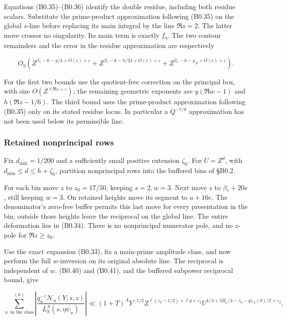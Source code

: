 \documentclass[11pt,a4paper]{article}
\begin{document}
Equations (B0.35)--(B0.36) identify the double residue, including both
residue scalars. Substitute the prime-product approximation following
(B0.35) on the global \(s\)-line before replacing its main integral by
the line \(\Re s=2\). The latter move crosses no singularity. Its main
term is exactly \(f_\eta\). The two contour remainders and the error in
the residue approximation are respectively

\[
O_\eta\!\left(
 Z^{\beta_*-k-y/4+O(e)+\varepsilon}
+Z^{\beta_*-k-h/24+O(e)+\varepsilon}
+Z^{\beta_*-k-\mu_P+O(e)+\varepsilon}
\right).
\tag{B0.52}
\]

For the first two bounds use the quotient-free correction on the
principal box, with size \(O(Z^{\ell\Re z+\varepsilon})\); the remaining
geometric exponents are \(y(\Re w-1)\) and \(h(\Re z-1/6)\). The third
bound uses the prime-product approximation following (B0.35) only on its
stated residue locus. In particular a \(Q^{-7/8}\) approximation has not
been used below its permissible line.

\hypertarget{retained-nonprincipal-rows}{%
\subsubsection{Retained nonprincipal
rows}\label{retained-nonprincipal-rows}}

Fix \(d_{\min}=1/200\) and a sufficiently small positive extension
\(\zeta_0\). For \(U=Z^d\), with \(d_{\min}\le d\le h+\zeta_0\),
partition nonprincipal rows into the buffered bins of §B0.2.

For each bin move \(z\) to \(z_0=17/50\), keeping \(s=2,\allowbreak{}w=3\). Next move
\(s\) to \(\beta_*+20e\), still keeping \(w=3\). On retained heights
move its segment to \(a+16e\). The denominator's zero-free buffer
permits this last move for every presentation in the bin; outside those
heights leave the reciprocal on the global line. The entire deformation
lies in (B0.34). There is no nonprincipal numerator pole, and no
\(z\)-pole for \(\Re z\ge z_0\).

Use the exact expansion (B0.33), fix a main-prime amplitude class, and
now perform the full \(w\)-inversion on its original absolute line. The
reciprocal is independent of \(w\). (B0.40) and (B0.41), and the
buffered subpower reciprocal bound, give

\[
\sum_{u\ \text{ in the class}}^{(6)}
\left|\frac{q_u^{-z}\mathcal N_u(Y;s,z)}
{L_{\mathbb K}^S(s,\eta\overline{\psi_u})}\right|
\ll (1+T)^A Y^{-1/2}
Z^{\ell(z_0-1/2)+\ell q+\varepsilon_2}
U^{1/4+3R_\kappa/4-z_0-qz_A(d)/2+\varepsilon_2},
\tag{B0.53}
\]
\end{document}

